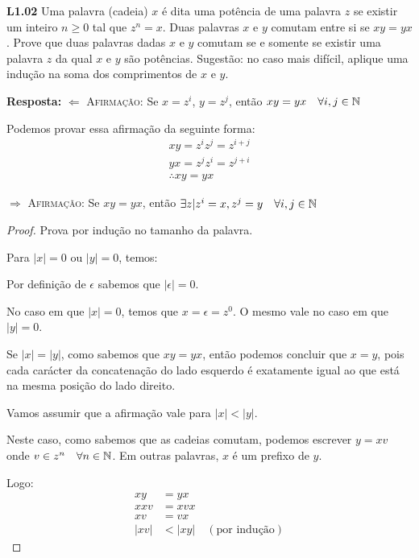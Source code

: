 
\noindent \textbf{L1.02} Uma palavra (cadeia) $x$ é dita uma potência de uma palavra $z$ se existir um inteiro $n \geq 0$ tal que $z^n = x$. Duas palavras $x$ e $y$ comutam entre si se $xy = yx$. Prove que duas palavras dadas $x$ e $y$ comutam se e somente se existir uma palavra $z$ da qual $x$ e $y$ são potências. Sugestão: no caso mais difícil, aplique uma indução na soma dos comprimentos de $x$ e $y$.

\textbf{Resposta:} $\Leftarrow$ \textsc{Afirmação:} Se $x = z^i$, $y = z^j$, então $xy = yx \quad \forall i, j \in \mathbb{N}$

Podemos provar essa afirmação da seguinte forma:
\begin{align*}
    xy = z^iz^j = z^{i+j} \\
    yx = z^jz^i = z^{j+i} \\
    \therefore xy = yx
\end{align*}

$\Rightarrow$ \textsc{Afirmação:} Se $xy = yx$, então $\exists z | z^i = x, z^j = y \quad \forall i, j \in \mathbb{N}$

\begin{proof} Prova por indução no tamanho da palavra.

\indbase Para $|x| = 0$ ou $|y| = 0$, temos:

Por definição de $\epsilon$ sabemos que $|\epsilon| = 0$.

No caso em que $|x| = 0$, temos que $x = \epsilon = z^0$. O mesmo vale no caso em que $|y| = 0$.

Se $|x| = |y|$, como sabemos que $xy = yx$, então podemos concluir que $x = y$, pois cada carácter da concatenação do lado esquerdo é exatamente igual ao que está na mesma posição do lado direito.

\indhypo Vamos assumir que a afirmação vale para $|x| < |y|$.

\indstep Neste caso, como sabemos que as cadeias comutam, podemos escrever $y = xv$ onde $v \in z^n \quad \forall n \in \mathbb{N}$. Em outras palavras, $x$ é um prefixo de $y$.

Logo:
\begin{align*}
    xy   &= yx  \\
    xxv  &= xvx \\
    xv   &= vx  \\
    |xv| &< |xy| \quad (\text{por indução})
\end{align*}
\end{proof}